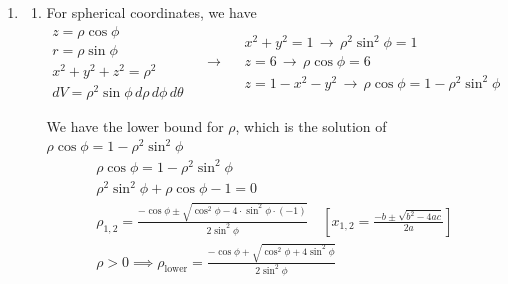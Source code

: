 \documentclass[a4paper, 12pt]{article}
\begin{document}
\begin{enumerate}[leftmargin=*,label=\textbf{\arabic*.}]
\begin{enumerate}[leftmargin=*,label=\textbf{\alph*.}]
\begin{center}
\end{center}

\item Using the double integral below, we find the lateral surface area.
\begin{align*}
A&=\iint_D\sqrt{1+\left(\frac{\partial z}{\partial x}\right)^2 +\left(\frac{\partial z}{\partial y}\right)^2}\,dA\\[1em]&=\iint_D\sqrt{1+\left(\frac{x}{\sqrt{x^2+y^2}}\right)^2 +\left(\frac{y}{\sqrt{x^2+y^2}}\right)^2}\,dA \\[1em]&=\iint_D\sqrt{1+\left(\frac{x^2+y^2}{x^2+y^2}\right)}\,dA=\iint_D\sqrt{1+1}\,dA=\sqrt{2}\iint_D\,dA
\end{align*}

\newpage

If we switch to polar coordinates, we can easily evaluate the integral.
\[A=\sqrt2\int_0^{2\pi}\int_1^2\,r\,dr\,d\theta=\sqrt2\int_0^{2\pi}\left[\frac{r^2}2\right]_{r=1}^{r=2}\,d\theta=\sqrt2\int_0^{2\pi}\frac32\,d\theta=\boxed{3\pi\sqrt2}\]
\end{enumerate}

\item \begin{enumerate}[leftmargin=*,label=\textbf{\alph*.}]
\item For spherical coordinates, we have
\[
\begin{array}{c}
z=\rho\cos\phi\\
r=\rho\sin\phi\\
x^2+y^2+z^2=\rho^2\\
dV=\rho^2\sin\phi\,d\rho\,d\phi\,d\theta
\end{array}\quad\rightarrow\quad
\begin{array}{c}
x^2+y^2=1\,\rightarrow\,\rho^2\sin^2\phi = 1\\
z=6\,\rightarrow\,\rho\cos\phi=6\\
z=1-x^2-y^2\,\rightarrow\,\rho\cos\phi=1-\rho^2\sin^2\phi
\end{array}
\]

We have the lower bound for $\rho$, which is the solution of $\rho\cos\phi=1-\rho^2\sin^2\phi$
\[
\begin{array}{c}
\rho\cos\phi=1-\rho^2\sin^2\phi\\[1em]
\rho^2\sin^2\phi+\rho\cos\phi-1=0\\[1em]
\displaystyle \rho_{1,2} = \frac{-\cos\phi \pm\sqrt{\cos^2\phi-4\cdot\sin^2\phi\cdot(-1)}}{2\sin^2\phi}\quad\left[x_{1,2}=\frac{-b\pm\sqrt{b^2-4ac}}{2a}\right]\\[1em]
\displaystyle \rho>0\implies\rho_{\text{lower}}=\frac{-\cos\phi +\sqrt{\cos^2\phi+4\sin^2\phi}}{2\sin^2\phi}
\end{array}
\]


\end{enumerate}
\end{enumerate}
\end{document}
